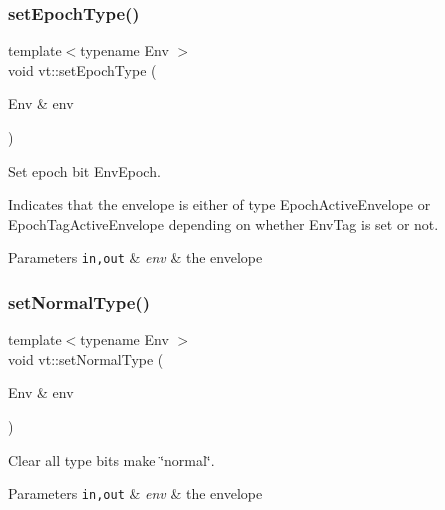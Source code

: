 \subsubsection{\texorpdfstring{set\+Epoch\+Type()}{setEpochType()}}
{\footnotesize\ttfamily template$<$typename Env $>$ \\
void vt\+::set\+Epoch\+Type (\begin{DoxyParamCaption}\item[{Env \&}]{env }\end{DoxyParamCaption})\hspace{0.3cm}{\ttfamily [inline]}}



Set epoch bit {\ttfamily Env\+Epoch}. 

Indicates that the envelope is either of type {\ttfamily Epoch\+Active\+Envelope} or {\ttfamily Epoch\+Tag\+Active\+Envelope} depending on whether {\ttfamily Env\+Tag} is set or not.


\begin{DoxyParams}[1]{Parameters}
\mbox{\tt in,out}  & {\em env} & the envelope \\
\hline
\end{DoxyParams}
\mbox{\label{namespacevt_aa76e59d48d53aa1e4c60bd55ff520d6a}} 
\subsubsection{\texorpdfstring{set\+Normal\+Type()}{setNormalType()}}
{\footnotesize\ttfamily template$<$typename Env $>$ \\
void vt\+::set\+Normal\+Type (\begin{DoxyParamCaption}\item[{Env \&}]{env }\end{DoxyParamCaption})\hspace{0.3cm}{\ttfamily [inline]}}



Clear all type bits make \char`\"{}normal\char`\"{}. 


\begin{DoxyParams}[1]{Parameters}
\mbox{\tt in,out}  & {\em env} & the envelope \\
\hline
\end{DoxyParams}
\mbox{\label{namespacevt_a2206947364b94e9c7dba38df257d095b}} 
